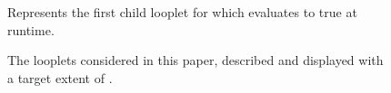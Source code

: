 \begin{figure}
\begin{minipage}{0.55\linewidth}
  Represents the first child looplet  for which
   evaluates to true at runtime.

\end{minipage}\hspace{8pt}%
\begin{minipage}{0.45\linewidth - 8pt}

\end{minipage}
  \caption{The looplets considered in this paper, described and displayed with a target extent of .}\label{fig:looplets}
\end{figure}